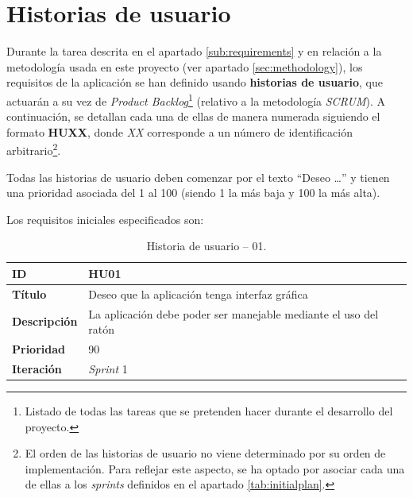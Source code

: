 
\section{Historias de usuario} \label{sec:userrequirements}

Durante la tarea descrita en el apartado \ref{sub:requirements} y en relación a la metodología usada en este proyecto (ver apartado \ref{sec:methodology}), los requisitos de la aplicación se han definido usando \textbf{historias de usuario}, que actuarán a su vez de \textit{Product  Backlog}\footnote{Listado  de todas  las  tareas  que  se  pretenden  hacer  durante  el desarrollo del proyecto.} (relativo a la metodología \textit{SCRUM}). A continuación, se detallan cada una de ellas de manera numerada siguiendo el formato \textbf{HUXX}, donde \textit{XX} corresponde a un número de identificación arbitrario\footnote{El orden de las historias de usuario no viene determinado por su orden de implementación. Para reflejar este aspecto, se ha optado por asociar cada una de ellas a los \textit{sprints} definidos en el apartado \ref{tab:initialplan}.}.\sn

Todas las historias de usuario deben comenzar por el texto ``Deseo \ldots'' y tienen una prioridad asociada del 1 al 100 (siendo 1 la más baja y 100 la más alta).\sn

Los requisitos iniciales especificados son:\sn

\begin{table}[H]
    \begin{center}
        \begin{tabularx}{\textwidth}{| l | X |}
            \hline
            \textbf{ID}             & HU01 \\ \hline
            \textbf{Título}         & Deseo que la aplicación tenga interfaz gráfica \\ \hline
            \textbf{Descripción}    & La aplicación debe poder ser manejable mediante el uso del ratón \\ \hline
            \textbf{Prioridad}      & 90 \\ \hline
            \textbf{Iteración}      & \textit{Sprint} 1 \\ \hline
        \end{tabularx}
    \end{center}
    \caption{Historia de usuario -- 01.}
    \label{tab:hu01}
\end{table}

